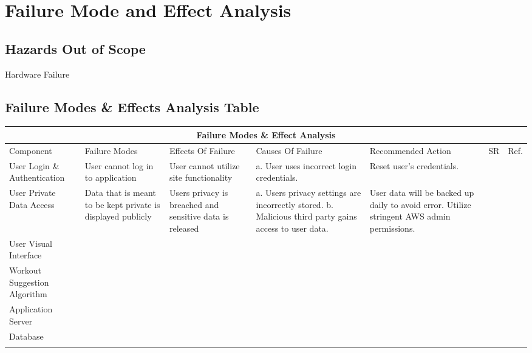 \documentclass{article}
\begin{document}
	
	\section{Failure Mode and Effect Analysis}
	\subsection{Hazards Out of Scope}
	Hardware Failure 
	\subsection{Failure Modes \& Effects Analysis Table}
	
	\begin{adjustwidth}{-3cm}{-1cm}
	\centering
	\noindent\begin{tabular}{ |p{3.3cm}||p{2.5cm}|p{3.2cm}|p{2cm}|p{3.3cm}|p{0.7cm}|p{0.7cm}| @{} }
		\hline
		\multicolumn{7}{|c|}{Failure Modes \& Effect Analysis} \\
		\hline
		Component & Failure Modes & Effects Of Failure & Causes Of Failure & Recommended Action & SR & Ref.\\
		\hline
		User Login \& Authentication& User cannot log in to application & User cannot utilize site functionality & 
			a. User uses incorrect login credentials.
			& 
			Reset user's credentials.
			& &\\
		\hline
		User Private Data Access & Data that is meant to be kept private is displayed publicly & 
			Users privacy is breached and sensitive data is released & 
				a. Users privacy settings are incorrectly stored.
				\newline
				b. Malicious third party gains access to user data.
			& 
				User data will be backed up daily to avoid error. Utilize stringent AWS admin permissions.
			& &\\
		\hline
		User Visual Interface &  & & & & &\\
		\hline
		Workout Suggestion Algorithm& & & & & &\\
		\hline
		Application Server& & & & & &\\
		\hline
		Database& & & & & &\\
		\hline
		& & & & & &\\
		\hline
	\end{tabular}
	\end{adjustwidth}
\end{document}
